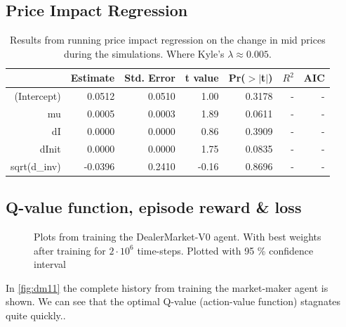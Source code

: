 \documentclass{kththesis}
\theoremstyle{definition}
\begin{document}
\subsection*{Price Impact Regression}
\begin{table}[H]
\centering
\begin{tabular}{rrrrrrr}
  \hline
 & Estimate & Std. Error & t value & Pr($>$$|$t$|$) & $R^{2} $ & AIC  \\ 
 
  \hline
(Intercept) & 0.0512 & 0.0510 & 1.00 & 0.3178 & - & - \\ 
  mu & 0.0005 & 0.0003 & 1.89 & 0.0611 & - & - \\ 
  dI & 0.0000 & 0.0000 & 0.86 & 0.3909 & - & - \\ 
  dInit & 0.0000 & 0.0000 & 1.75 & 0.0835 & - & - \\ 
  sqrt(d\_inv) & -0.0396 & 0.2410 & -0.16 & 0.8696 & - & - \\ 
   \hline
\end{tabular}
\caption{Results from running price impact regression on the change in mid prices during the simulations. Where Kyle's $\lambda \approx 0.005$.}
\label{tab:pi1}
\end{table}

\subsection*{Q-value function, episode reward \& loss}
\begin{figure}[H]
	    	\centering
		
		\caption{Plots from training the DealerMarket-V0 agent. With best weights after training for $2\cdot 10^{6}$ time-steps. Plotted with 95 \% confidence interval}
		\label{fig:dm11}
\end{figure}
In \autoref{fig:dm11} the complete history from training the market-maker agent is shown. We can see that the optimal Q-value (action-value function) stagnates quite quickly..
\end{document}
